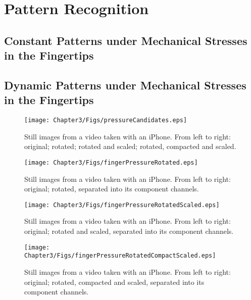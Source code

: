 \chapter{Pattern Recognition}

\ifpdf
    \graphicspath{{Chapter3/Figs/Raster/}{Chapter3/Figs/PDF/}{Chapter3/Figs/}}
\else
    \graphicspath{{Chapter3/Figs/Vector/}{Chapter3/Figs/}}
\fi

\section{Constant Patterns under Mechanical Stresses in the Fingertips}\label{sec:ConstantPatterns}

\section{Dynamic Patterns under Mechanical Stresses in the Fingertips}\label{sec:DynamicPatterns}

\begin{figure}[h!]
  \caption{Still images from a video taken with an iPhone. From left to right: original; rotated; rotated and scaled; rotated, compacted and scaled.}
  \label{fig:pressureCandidates}
  \centering
    \texttt{[image: Chapter3/Figs/pressureCandidates.eps]}
\end{figure}
\begin{figure}[h!]
  \caption{Still images from a video taken with an iPhone. From left to right: original; rotated, separated into its component channels.}
  \label{fig:pressureCandidates1}
  \centering
    \texttt{[image: Chapter3/Figs/fingerPressureRotated.eps]}
\end{figure}
\begin{figure}[h!]
  \caption{Still images from a video taken with an iPhone. From left to right: original; rotated and scaled, separated into its component channels.}
  \label{fig:pressureCandidates2}
  \centering
    \texttt{[image: Chapter3/Figs/fingerPressureRotatedScaled.eps]}
\end{figure}
\begin{figure}[h!]
  \caption{Still images from a video taken with an iPhone. From left to right: original; rotated, compacted and scaled, separated into its component channels.}
  \label{fig:pressureCandidate3}
  \centering
    \texttt{[image: Chapter3/Figs/fingerPressureRotatedCompactScaled.eps]}
\end{figure}

